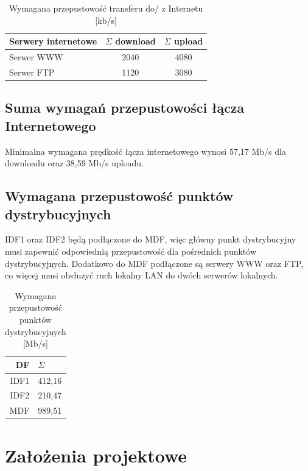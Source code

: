 \documentclass[12pt,a4paper]{article}
\begin{document}
	\begin{table}[H]
		\centering
		\begin{tabular}{l|c|c}
			Serwery internetowe&$\Sigma$ download&$\Sigma$ upload\\\hline
			Serwer WWW&2040&4080\\
			Serwer FTP&1120&3080\\
		\end{tabular}
		\caption{Wymagana przepustowość transferu do/ z Internetu [kb/s]}
	\end{table}

	\subsection{Suma wymagań przepustowości łącza Internetowego}

	Minimalna wymagana prędkość łącza internetowego wynosi 57,17 Mb/s dla downloadu oraz 38,59 Mb/s uploadu.
	
	\subsection{Wymagana przepustowość punktów dystrybucyjnych}
	
	IDF1 oraz IDF2 będą podłączone do MDF, więc główny punkt dystrybucyjny musi zapewnić odpowiednią przepustowość dla pośrednich punktów dystrybucyjnych. Dodatkowo do MDF podłączone są serwery WWW oraz FTP, co więcej musi obsłużyć ruch lokalny LAN do dwóch serwerów lokalnych.
	
	\begin{table}[H]
		\centering
		\begin{tabular}{r|l}
			DF & $\Sigma$\\\hline
			IDF1 & 412,16\\
			IDF2 & 210,47\\
			MDF & 989,51
		\end{tabular}
		\caption{Wymagana przepustowość punktów dystrybucyjnych [Mb/s]}
	\end{table}

	\section{Założenia projektowe}
	
\end{document}

